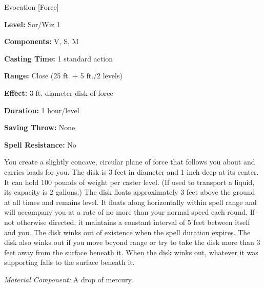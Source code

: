 
Evocation [Force]

\textbf{Level:} Sor/Wiz 1

\textbf{Components:} V, S, M

\textbf{Casting Time:} 1 standard action

\textbf{Range:} Close (25 ft. + 5 ft./2 levels)

\textbf{Effect:} 3-ft.-diameter disk of force

\textbf{Duration:} 1 hour/level

\textbf{Saving Throw:} None

\textbf{Spell Resistance:} No

You create a slightly concave, circular plane of force that follows you about and 
carries loads for you. The disk is 3 feet in diameter and 1 inch deep at its center. 
It can hold 100 pounds of weight per caster level. (If used to transport a liquid, 
its capacity is 2 gallons.) The disk floats approximately 3 feet above the ground 
at all times and remains level. It floats along horizontally within spell range 
and will accompany you at a rate of no more than your normal speed each round. 
If not otherwise directed, it maintains a constant interval of 5 feet between itself 
and you. The disk winks out of existence when the spell duration expires. The disk 
also winks out if you move beyond range or try to take the disk more than 3 feet 
away from the surface beneath it. When the disk winks out, whatever it was supporting 
falls to the surface beneath it.

\textit{Material Component:} A drop of mercury.

